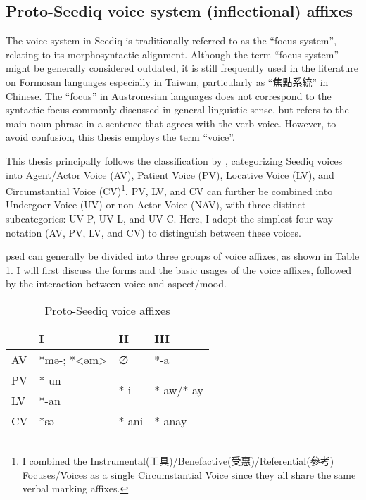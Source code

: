 \subsection{Proto-Seediq voice system (inflectional) affixes} \label{sec:psed_voice_affixes}

The voice system in Seediq is traditionally referred to as the ``focus system'', relating to its morphosyntactic alignment. Although the term ``focus system'' might be generally considered outdated, it is still frequently used in the literature on Formosan languages especially in Taiwan, particularly as ``焦點系統'' in Chinese. The ``focus'' in Austronesian languages does not correspond to the syntactic focus commonly discussed in general linguistic sense, but refers to the main noun phrase in a sentence that agrees with the verb voice. However, to avoid confusion, this thesis employs the term ``voice''.

This thesis principally follows the classification by \textcite{Sung2018Sedgrammar,Lee2018Trugrammar}, categorizing Seediq voices into Agent/Actor Voice (AV), Patient Voice (PV), Locative Voice (LV), and Circumstantial Voice (CV)\footnote{I combined the Instrumental(工具)/Benefactive(受惠)/Referential(參考) Focuses/Voices as a single Circumstantial Voice since they all share the same verbal marking affixes.}. PV, LV, and CV can further be combined into Undergoer Voice (UV) or non-Actor Voice (NAV), with three distinct subcategories: UV-P, UV-L, and UV-C. Here, I adopt the simplest four-way notation (AV, PV, LV, and CV) to distinguish between these voices.

\acl{psed} can generally be divided into three groups of voice affixes, as shown in Table \ref{tab:psed_voice}. I will first discuss the forms and the basic usages of the voice affixes, followed by the interaction between voice and aspect/mood.

\begin{table}[!htbp]
\centering
\caption{Proto-Seediq voice affixes}
\label{tab:psed_voice}
\begin{tabular}{llll}
\hline
   & I           & II                   & III                        \\ \hline
AV & *mə-; *<əm> & ∅                    & *-a                        \\
PV & *-un        & \multirow{2}{*}{*-i} & \multirow{2}{*}{*-aw/*-ay} \\
LV & *-an        &                      &                            \\
CV & *sə-        & *-ani                & *-anay                     \\ \hline
\end{tabular}
\end{table}



